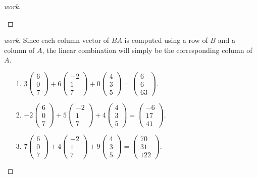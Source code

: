 \documentclass{article}
\begin{document}
\begin{enumerate}
{\begin{enumerate}
\begin{proof}[work]
\begin{enumerate}
        \end{enumerate}
      \end{proof}
      \begin{proof}[work] Since each column vector of $BA$ is computed using a row of $B$ and a column of $A$, the linear combination will simply be the corresponding column of $A$.
        \begin{enumerate}
          \item[1.] $3\begin{pmatrix}6 \\ 0 \\ 7\end{pmatrix} + 6\begin{pmatrix}-2 \\ 1 \\ 7\end{pmatrix} + 0\begin{pmatrix}4 \\ 3 \\ 5\end{pmatrix} = \begin{pmatrix}6 \\ 6 \\ 63\end{pmatrix}$.
          \item[2.] $-2\begin{pmatrix}6 \\ 0 \\ 7\end{pmatrix} + 5\begin{pmatrix}-2 \\ 1 \\ 7\end{pmatrix} + 4\begin{pmatrix}4 \\ 3 \\ 5\end{pmatrix} = \begin{pmatrix}-6 \\ 17 \\ 41\end{pmatrix}$.
          \item[3.] $7\begin{pmatrix}6 \\ 0 \\ 7\end{pmatrix} + 4\begin{pmatrix}-2 \\ 1 \\ 7\end{pmatrix} + 9\begin{pmatrix}4 \\ 3 \\ 5\end{pmatrix} = \begin{pmatrix}70 \\ 31 \\ 122\end{pmatrix}$.

\end{enumerate}
\end{proof}
\end{enumerate}}
\end{enumerate}
\end{document}

